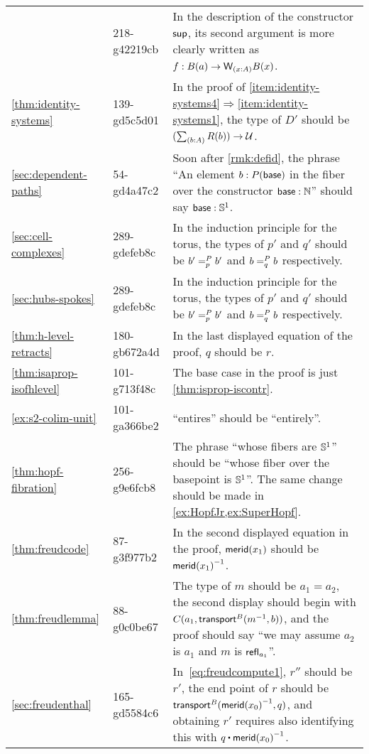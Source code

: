 \documentclass[
%
%
11pt %
]{article}
\begin{document}
\begin{longtable}{llp{10.5cm}}
  & 218-g42219cb
  & In the description of the constructor $\supp$, its second argument is more clearly written as $f : B(a) \to \wtype{x:A} B(x)$.\\
  \autoref{thm:identity-systems}
  & 139-gd5c5d01
  & In the proof of \ref{item:identity-systems4}$\Rightarrow$\ref{item:identity-systems1}, the type of $D'$ should be $(\sm{b:A} R(b)) \to \type$.\\
  \autoref{sec:dependent-paths}
  & 54-gd4a47c2
  & Soon after \autoref{rmk:defid}, the phrase ``An element $b:P(\base)$ in the fiber over the constructor $\base:\nat$'' should say $\base:\Sn^1$.\\
  \autoref{sec:cell-complexes}
  & 289-gdefeb8c
  & In the induction principle for the torus, the types of $p'$ and $q'$ should be $\dpath P p {b'} {b'}$ and $\dpath P q b b$ respectively.\\
  \autoref{sec:hubs-spokes}
  & 289-gdefeb8c
  & In the induction principle for the torus, the types of $p'$ and $q'$ should be $\dpath P p {b'} {b'}$ and $\dpath P q b b$ respectively.\\
  \autoref{thm:h-level-retracts}
  & 180-gb672a4d
  & In the last displayed equation of the proof, $q$ should be $r$.\\
  \autoref{thm:isaprop-isofhlevel}
  & 101-g713f48c
  & The base case in the proof is just \autoref{thm:isprop-iscontr}.\\
  \autoref{ex:s2-colim-unit}
  & 101-ga366be2
  & ``entires'' should be ``entirely''.\\
  \autoref{thm:hopf-fibration}
  & 256-g9e6fcb8
  & The phrase ``whose fibers are $\Sn^1$'' should be ``whose fiber over the basepoint is $\Sn ^1$''.
  The same change should be made in \autoref{ex:HopfJr,ex:SuperHopf}.\\
  \autoref{thm:freudcode}
  & 87-g3f977b2
  & In the second displayed equation in the proof, $\merid(x_1)$ should be $\opp{\merid(x_1)}$.\\
  \autoref{thm:freudlemma}
  & 88-g0c0be67
  & The type of $m$ should be $a_1=a_2$, the second display should begin with $C(a_1,\transfib{B}{\opp m}{b})$, and the proof should say ``we may assume $a_2$ is $a_1$ and $m$ is $\refl{a_1}$''.\\
  \autoref{sec:freudenthal}
  & 165-gd5584c6
  & In~\eqref{eq:freudcompute1}, $r''$ should be $r'$, the end point of $r$ should be $\transfib{B}{\opp{\merid(x_0)}}{q}$, and obtaining $r'$ requires also identifying this with $q \ct \opp{\merid(x_0)}$.

\end{longtable}
\end{document}
